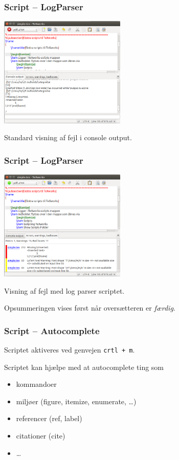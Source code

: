 \documentclass{beamer}
\begin{document}
\begin{frame}
\frametitle{Script -- LogParser}

\includegraphics[width=6cm]{pic/texworksConsoleOutput.png}

Standard visning af fejl i console output.

\end{frame}

\begin{frame}
\frametitle{Script -- LogParser}

\includegraphics[width=6cm]{pic/texworksLogParser.png}

Visning af fejl med log parser scriptet.

Opsummeringen vises først når oversætteren er \emph{færdig}.

\end{frame}


\begin{frame}[fragile]
\frametitle{Script -- Autocomplete}

Scriptet aktiveres ved genvejen \verb!crtl + m!.

Scriptet kan hjælpe med at autocomplete ting som 
\begin{itemize}
\item	kommandoer
\item	miljøer (figure, itemize, enumerate, \ldots)
\item	referencer (ref, label)
\item	citationer (cite)
\item 	\ldots
\end{itemize}

\end{frame}
\end{document}
